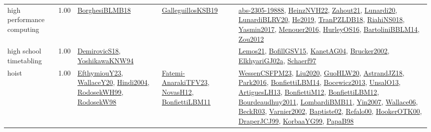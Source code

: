{\begin{longtable}{p{3cm}r>{\raggedright\arraybackslash}p{6cm}>{\raggedright\arraybackslash}p{6cm}>{\raggedright\arraybackslash}p{8cm}}
\index{high performance computing}\index{ApplicationAreas!high performance computing}high performance computing &  1.00 & \hyperref[detail:BorghesiBLMB18]{BorghesiBLMB18} & \hyperref[detail:GalleguillosKSB19]{GalleguillosKSB19} & \hyperref[detail:abs-2305-19888]{abs-2305-19888}, \hyperref[detail:HeinzNVH22]{HeinzNVH22}, \hyperref[detail:Zahout21]{Zahout21}, \hyperref[detail:Lunardi20]{Lunardi20}, \hyperref[detail:LunardiBLRV20]{LunardiBLRV20}, \hyperref[detail:He2019]{He2019}, \hyperref[detail:TranPZLDB18]{TranPZLDB18}, \hyperref[detail:RiahiNS018]{RiahiNS018}, \hyperref[detail:Yasmin2017]{Yasmin2017}, \hyperref[detail:Menouer2016]{Menouer2016}, \hyperref[detail:HurleyOS16]{HurleyOS16}, \hyperref[detail:BartoliniBBLM14]{BartoliniBBLM14}, \hyperref[detail:Zou2012]{Zou2012}\\
\index{high school timetabling}\index{ApplicationAreas!high school timetabling}high school timetabling &  1.00 & \hyperref[detail:DemirovicS18]{DemirovicS18}, \hyperref[detail:YoshikawaKNW94]{YoshikawaKNW94} &  & \hyperref[detail:Lemos21]{Lemos21}, \hyperref[detail:BofillGSV15]{BofillGSV15}, \hyperref[detail:KanetAG04]{KanetAG04}, \hyperref[detail:Brucker2002]{Brucker2002}, \hyperref[detail:ElkhyariGJ02a]{ElkhyariGJ02a}, \hyperref[detail:Schaerf97]{Schaerf97}\\
\index{hoist}\index{ApplicationAreas!hoist}hoist &  1.00 & \hyperref[detail:EfthymiouY23]{EfthymiouY23}, \hyperref[detail:WallaceY20]{WallaceY20}, \hyperref[detail:Hindi2004]{Hindi2004}, \hyperref[detail:RodosekWH99]{RodosekWH99}, \hyperref[detail:RodosekW98]{RodosekW98} & \hyperref[detail:Fatemi-AnarakiTFV23]{Fatemi-AnarakiTFV23}, \hyperref[detail:NovasH12]{NovasH12}, \hyperref[detail:BonfiettiLBM11]{BonfiettiLBM11} & \hyperref[detail:WessenCSFPM23]{WessenCSFPM23}, \hyperref[detail:Liu2020]{Liu2020}, \hyperref[detail:GuoHLW20]{GuoHLW20}, \hyperref[detail:AstrandJZ18]{AstrandJZ18}, \hyperref[detail:Park2016]{Park2016}, \hyperref[detail:BonfiettiLBM14]{BonfiettiLBM14}, \hyperref[detail:Bocewicz2013]{Bocewicz2013}, \hyperref[detail:UnsalO13]{UnsalO13}, \hyperref[detail:ArtiguesLH13]{ArtiguesLH13}, \hyperref[detail:BonfiettiM12]{BonfiettiM12}, \hyperref[detail:BonfiettiLBM12]{BonfiettiLBM12}, \hyperref[detail:Bourdeaudhuy2011]{Bourdeaudhuy2011}, \hyperref[detail:LombardiBMB11]{LombardiBMB11}, \hyperref[detail:Yin2007]{Yin2007}, \hyperref[detail:Wallace06]{Wallace06}, \hyperref[detail:BeckR03]{BeckR03}, \hyperref[detail:Varnier2002]{Varnier2002}, \hyperref[detail:Baptiste02]{Baptiste02}, \hyperref[detail:Refalo00]{Refalo00}, \hyperref[detail:HookerOTK00]{HookerOTK00}, \hyperref[detail:DraperJCJ99]{DraperJCJ99}, \hyperref[detail:KorbaaYG99]{KorbaaYG99}, \hyperref[detail:PapaB98]{PapaB98}\\

\end{longtable}}
